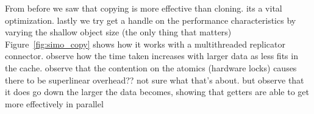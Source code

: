 From before we saw that copying is more effective than cloning. its a vital optimization. lastly we try get a handle on the performance characteristics by varying the shallow object size (the only thing that matters)
Figure~\ref{fig:simo_copy} shows how it works with a multithreaded replicator connector. 
observe how the time taken increases with larger data as less fits in the cache. observe that the contention on the atomics (hardware locks) causes there to be superlinear overhead?? not sure what that's about. but observe that it does go down the larger the data becomes, showing that getters are able to get more effectively in parallel
\begin{figure}
	\centering
\end{figure}
